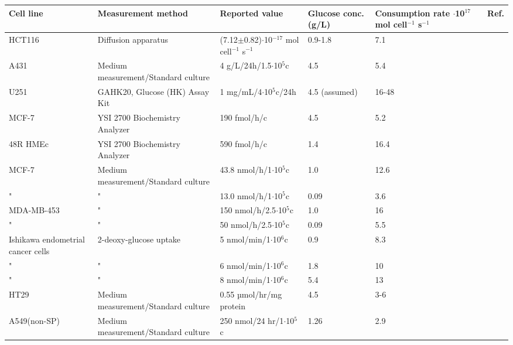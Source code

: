 \documentclass[11pt,a4paper]{article}
\begin{document}
\begin{table}[h!]
\begin{center}
\begin{tabular}{ |p{18mm}|p{26mm}|p{35mm}|p{20mm}|p{25mm}|p{7mm}| }
 \hline

 \textbf{Cell line}  & \textbf{Measurement method} & \textbf{Reported  value} & Glucose conc. (g/L) &  \textbf{Consumption rate} $\cdot$10$^{17}$ mol cell$^{-1}$ s$^{-1}$  & Ref. \\
 \hline
 HCT116 & Diffusion apparatus & (7.12$\pm$0.82)$\cdot$10$^{-17}$ mol cell$^{-1}$ s$^{-1}$& 0.9-1.8 & 7.1 & \cite{Mao2018}\\
 \hline
   A431 & Medium measurement/Standard culture  & 4 g/L/24h/1.5$\cdot$10$^{5}$c & 4.5  & 5.4 & \cite{Ang2020}\\
 \hline
    U251 &  GAHK20, Glucose (HK) Assay Kit & 1 mg/mL/4$\cdot$10$^{5}$c/24h & 4.5 (assumed) & 16-48 & \cite{Liu2021}\\
 \hline
     MCF-7 & YSI 2700 Biochemistry Analyzer  & 190 fmol/h/c & 4.5 & 5.2 & \cite{Meadows2008}\\
 \hline
     48R HMEc & YSI 2700 Biochemistry Analyzer  & 590 fmol/h/c & 1.4 & 16.4 & \cite{Meadows2008}\\
 \hline
    MCF-7 & Medium measurement/Standard culture  & 43.8 nmol/h/1$\cdot$10$^{5}$c & 1.0 & 12.6 & \cite{Mazurek1997}\\
 \hline
     " & "  & 13.0 nmol/h/1$\cdot$10$^{5}$c & 0.09 & 3.6 & \cite{Mazurek1997}\\
 \hline
     MDA-MB-453 & "  & 150 nmol/h/2.5$\cdot$10$^{5}$c & 1.0 & 16 & \cite{Mazurek1997}\\
 \hline
     " & "  & 50 nmol/h/2.5$\cdot$10$^{5}$c & 0.09 & 5.5 & \cite{Mazurek1997}\\
 \hline
 	Ishikawa endometrial cancer cells & 2-deoxy-glucose uptake & 5 nmol/min/1$\cdot$10$^{6}$c  & 0.9 & 8.3 & \cite{Medina2004}\\
\hline
 	" & " & 6 nmol/min/1$\cdot$10$^{6}$c & 1.8 & 10 & \cite{Medina2004}\\
\hline
 	" & " & 8 nmol/min/1$\cdot$10$^{6}$c & 5.4 & 13 & \cite{Medina2004}\\
\hline
 HT29 & Medium measurement/Standard culture & 0.55 µmol/hr/mg protein  & 4.5 & 3-6 & \cite{Gauthier1989}\\
 \hline
  A549(non-SP) & Medium measurement/Standard culture & 250 nmol/24 hr/1$\cdot$10$^{5}$c  & 1.26 & 2.9 & \cite{Liu2013}\\

\end{tabular}
\end{center}
\end{table}
\end{document}
